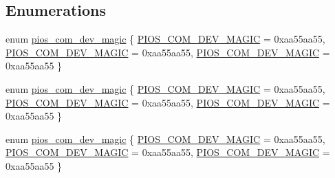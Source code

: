 \subsection*{Enumerations}
\begin{DoxyCompactItemize}
\item 
enum \hyperlink{group___p_i_o_s___c_o_m_ga57d90f793d1e8323599fd11e929c945d}{pios\-\_\-com\-\_\-dev\-\_\-magic} \{ \hyperlink{group___p_i_o_s___c_o_m_gga57d90f793d1e8323599fd11e929c945dad53a3c0754f6da5d578fcd99184abc84}{P\-I\-O\-S\-\_\-\-C\-O\-M\-\_\-\-D\-E\-V\-\_\-\-M\-A\-G\-I\-C} = 0xaa55aa55, 
\hyperlink{group___p_i_o_s___c_o_m_gga57d90f793d1e8323599fd11e929c945dad53a3c0754f6da5d578fcd99184abc84}{P\-I\-O\-S\-\_\-\-C\-O\-M\-\_\-\-D\-E\-V\-\_\-\-M\-A\-G\-I\-C} = 0xaa55aa55, 
\hyperlink{group___p_i_o_s___c_o_m_gga57d90f793d1e8323599fd11e929c945dad53a3c0754f6da5d578fcd99184abc84}{P\-I\-O\-S\-\_\-\-C\-O\-M\-\_\-\-D\-E\-V\-\_\-\-M\-A\-G\-I\-C} = 0xaa55aa55
 \}
\item 
enum \hyperlink{group___p_i_o_s___c_o_m_ga57d90f793d1e8323599fd11e929c945d}{pios\-\_\-com\-\_\-dev\-\_\-magic} \{ \hyperlink{group___p_i_o_s___c_o_m_gga57d90f793d1e8323599fd11e929c945dad53a3c0754f6da5d578fcd99184abc84}{P\-I\-O\-S\-\_\-\-C\-O\-M\-\_\-\-D\-E\-V\-\_\-\-M\-A\-G\-I\-C} = 0xaa55aa55, 
\hyperlink{group___p_i_o_s___c_o_m_gga57d90f793d1e8323599fd11e929c945dad53a3c0754f6da5d578fcd99184abc84}{P\-I\-O\-S\-\_\-\-C\-O\-M\-\_\-\-D\-E\-V\-\_\-\-M\-A\-G\-I\-C} = 0xaa55aa55, 
\hyperlink{group___p_i_o_s___c_o_m_gga57d90f793d1e8323599fd11e929c945dad53a3c0754f6da5d578fcd99184abc84}{P\-I\-O\-S\-\_\-\-C\-O\-M\-\_\-\-D\-E\-V\-\_\-\-M\-A\-G\-I\-C} = 0xaa55aa55
 \}
\item 
enum \hyperlink{group___p_i_o_s___c_o_m_ga57d90f793d1e8323599fd11e929c945d}{pios\-\_\-com\-\_\-dev\-\_\-magic} \{ \hyperlink{group___p_i_o_s___c_o_m_gga57d90f793d1e8323599fd11e929c945dad53a3c0754f6da5d578fcd99184abc84}{P\-I\-O\-S\-\_\-\-C\-O\-M\-\_\-\-D\-E\-V\-\_\-\-M\-A\-G\-I\-C} = 0xaa55aa55, 
\hyperlink{group___p_i_o_s___c_o_m_gga57d90f793d1e8323599fd11e929c945dad53a3c0754f6da5d578fcd99184abc84}{P\-I\-O\-S\-\_\-\-C\-O\-M\-\_\-\-D\-E\-V\-\_\-\-M\-A\-G\-I\-C} = 0xaa55aa55, 
\hyperlink{group___p_i_o_s___c_o_m_gga57d90f793d1e8323599fd11e929c945dad53a3c0754f6da5d578fcd99184abc84}{P\-I\-O\-S\-\_\-\-C\-O\-M\-\_\-\-D\-E\-V\-\_\-\-M\-A\-G\-I\-C} = 0xaa55aa55
 \}
\end{DoxyCompactItemize}
